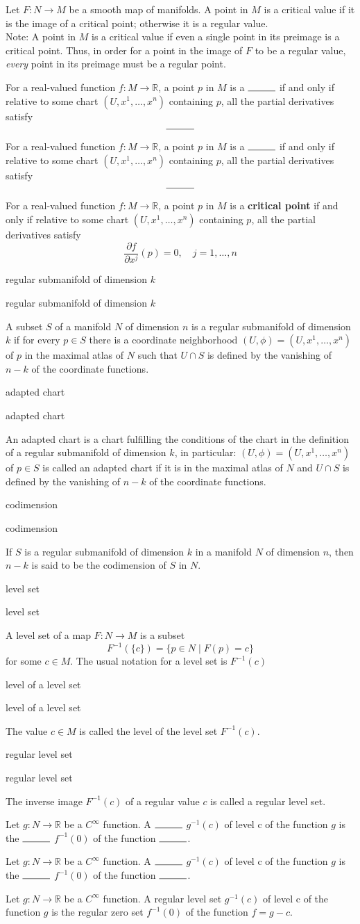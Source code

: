 \documentclass[17pt]{extarticle}
\newcommand{\boxset}[2]{\begin{mdframed}[style=darkQuesion]
#1
\end{mdframed}
\newpage
\begin{mdframed}[style=darkQuesion]
  #1
    \end{mdframed}
\begin{mdframed}[style=darkAnswer]
  #2
    \end{mdframed}
    \newpage
}
\begin{document}
{Let $F: N \rightarrow M$ be a smooth map of manifolds. A point in $M$ is a critical value if it is the image of a critical point; otherwise it is a regular value.
\[\ \]
Note: A point in $M$ is a critical value if even a single point in its preimage is a critical point. Thus, in order for a point in the image of $F$ to be a regular value, \textit{every} point in its preimage must be a regular point.}
\boxset{For a real-valued function $f: M \rightarrow \mathbb{R}$, a point $p$
in $M$ is a $\rule{1cm}{0.15mm}$ if and only if relative to some chart
$\left(U, x^{1}, \ldots, x^{n}\right)$ containing $p$, all the partial
derivatives satisfy
\[\rule{1cm}{0.15mm}\]}
{For a real-valued function $f: M \rightarrow \mathbb{R}$, a point $p$ in $M$ is a \textbf{critical point} if and only if relative to some chart $\left(U, x^{1}, \ldots, x^{n}\right)$ containing $p$, all the partial derivatives satisfy
\[\frac{\partial f}{\partial x^{j}}(p)=0, \quad j=1, \ldots, n\]}
\boxset{regular submanifold of dimension $k$}
{A subset $S$ of a manifold $N$ of dimension $n$ is a regular submanifold of dimension $k$ if for every $p \in S$ there is a coordinate neighborhood $(U, \phi)=\left(U, x^{1}, \ldots, x^{n}\right)$ of $p$ in the maximal atlas of $N$ such that $U \cap S$ is defined by the vanishing of $n-k$ of the coordinate functions.}
\boxset{adapted chart }
{An adapted chart is a chart fulfilling the conditions of the chart in the definition of a regular submanifold of dimension $k$, in particular: $(U, \phi)=\left(U, x^{1}, \ldots, x^{n}\right)$ of $p\in S$ is called an adapted chart if it is in the maximal atlas of $N$ and $U \cap S$ is defined by the vanishing of $n-k$ of the coordinate functions.}
\boxset{codimension}
{If $S$ is a regular submanifold of dimension $k$ in a manifold $N$ of dimension $n$, then $n-k$ is said to be the codimension of $S$ in $N$.}
\boxset{level set}
{A level set of a map $F: N \rightarrow M$ is a subset
\[F^{-1}(\{c\})=\{p \in N \mid F(p)=c\}\]
for some $c \in M$. The usual notation for a level set is $F^{-1}(c)$}
\boxset{level of a level set}
{The value $c \in M$ is called the level of the level set $F^{-1}(c)$.}
\boxset{regular level set}
{The inverse image $F^{-1}(c)$ of a regular value $c$ is called a regular level set.}
\boxset{Let $g: N \rightarrow \mathbb{R}$ be a $C^{\infty}$ function. A $\rule{1cm}{0.15mm}$ $g^{-1}(c)$ of level c of the function $g$ is the $\rule{1cm}{0.15mm}$ $f^{-1}(0)$ of the function $\rule{1cm}{0.15mm}$.}
{Let $g: N \rightarrow \mathbb{R}$ be a $C^{\infty}$ function. A regular level set $g^{-1}(c)$ of level c of the function $g$ is the regular zero set $f^{-1}(0)$ of the function $f=g-c$.}
\end{document}
